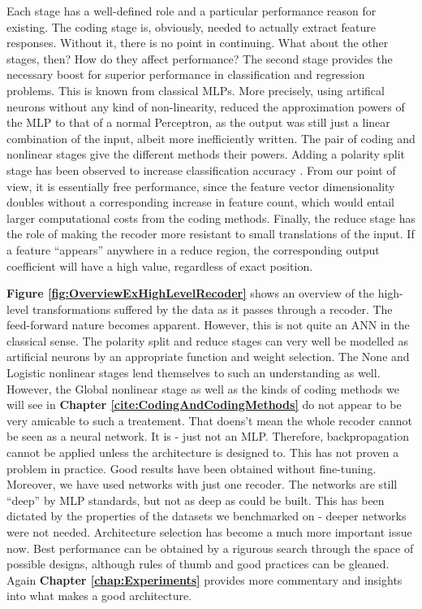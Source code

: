 \documentclass[12pt,a4paper,oneside,english]{UPBThesis}
\begin{document}
Each stage has a well-defined role and a particular performance reason for existing. The coding stage is, obviously, needed to actually extract feature responses. Without it, there is no point in continuing. What about the other stages, then? How do they affect performance? The second stage provides the necessary boost for superior performance in classification and regression problems. This is known from classical MLPs. More precisely, using artifical neurons without any kind of non-linearity, reduced the approximation powers of the MLP to that of a normal Perceptron, as the output was still just a linear combination of the input, albeit more inefficiently written. The pair of coding and nonlinear stages give the different methods their powers. Adding a polarity split stage has been observed to increase classification accuracy \cite{importance-encoding-sparse-coding-vq}. From our point of view, it is essentially free performance, since the feature vector dimensionality doubles without a corresponding increase in feature count, which would entail larger computational costs from the coding methods. Finally, the reduce stage has the role of making the recoder more resistant to small translations of the input. If a feature ``appears'' anywhere in a reduce region, the corresponding output coefficient will have a high value, regardless of exact position.

\textbf{Figure \ref{fig:OverviewExHighLevelRecoder}} shows an overview of the high-level transformations suffered by the data as it passes through a recoder. The feed-forward nature becomes apparent. However, this is not quite an ANN in the classical sense. The polarity split and reduce stages can very well be modelled as artificial neurons by an appropriate function and weight selection. The None and Logistic nonlinear stages lend themselves to such an understanding as well. However, the Global nonlinear stage as well as the kinds of coding methods we will see in \textbf{Chapter \ref{cite:CodingAndCodingMethods}} do not appear to be very amicable to such a treatement. That doens't mean the whole recoder cannot be seen as a neural network. It is - just not an MLP. Therefore, backpropagation cannot be applied unless the architecture is designed to. This has not proven a problem in practice. Good results have been obtained without fine-tuning. Moreover, we have used networks with just one recoder. The networks are still ``deep'' by MLP standards, but not as deep as could be built. This has been dictated by the properties of the datasets we benchmarked on - deeper networks were not needed. Architecture selection has become a much more important issue now. Best performance can be obtained by a rigurous search through the space of possible designs, although rules of thumb and good practices can be gleaned. Again \textbf{Chapter \ref{chap:Experiments}} provides more commentary and insights into what makes a good architecture.
\end{document}
